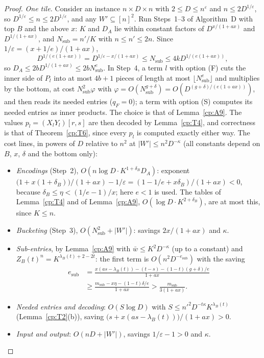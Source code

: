 \documentclass[11pt]{article}
\theoremstyle{definition}
\theoremstyle{remark}
\providecommand{\eps}{\varepsilon}
\newcommand{\abs}[1]{\lvert #1\rvert}
\newcommand{\ZB}{Z_B}                         %
\newcommand{\lamB}{\lambda_B}                 %
\newcommand{\delB}{\delta_B}                  %
\newcommand{\AlgD}{Algorithm~D}                             %
\begin{document}
\begin{proof}
\emph{One tile.} Consider an instance $n\times D\times n$ with $2\le D\le n^\eps$ and $n\le2D^{1/\eps}$, so $D^{1/\eps}\le n\le2D^{1/\eps}$, and any $W'\subseteq[n]^2$. Run Steps~1--3 of \AlgD{} with top $B$ and the above $x$: $K$ and $D_A$ lie within constant factors of $D^{x/(1+ax)}$ and $D^{1/(1+ax)}$, and $N_{\mathrm{sub}}=n'/K$ with $n\le n'\le2n$. Since $1/\eps=(x+1/e)/(1+ax)$,
\[
D^{1/(e(1+ax))}=D^{1/\eps-x/(1+ax)}\le N_{\mathrm{sub}}\le4kD^{1/(e(1+ax))},
\]
so $D_A\le2bD^{1/(1+ax)}\le2bN_{\mathrm{sub}}^e$. In Step~4, a term $l$ with option (F) cuts the inner side of $P_l$ into at most $4b+1$ pieces of length at most $\lfloor N_{\mathrm{sub}}^e\rfloor$ and multiplies by the bottom, at cost $N_{\mathrm{sub}}^2\varphi$ with $\varphi=O(N_{\mathrm{sub}}^{g+\delta})=O(D^{(g+\delta)/(e(1+ax))})$, and then reads its needed entries ($q_F=0$); a term with option (S) computes its needed entries as inner products. The choice is that of Lemma~\ref{cp:A9}. The values $p_l=(X_lY_l)[r,s]$ are then decoded by Lemma~\ref{cp:T4}, and correctness is that of Theorem~\ref{cp:T6}, since every $p_l$ is computed exactly either way. The cost lines, in powers of $D$ relative to $n^2$ at $\abs{W'}\le n^2D^{-\kappa}$ (all constants depend on $B$, $x$, $\delta$ and the bottom only):
\begin{itemize}
\item \emph{Encodings} (Step~2), $O(n\log D\cdot K^{1+\delB}D_A)$: exponent $\bigl(1+x(1+\delB)\bigr)/(1+ax)-1/\eps=(1-1/e+x\delB)/(1+ax)<0$, because $\delB\le\eta<(1/e-1)/x$; here $e<1$ is used. The tables of Lemma~\ref{cp:T4} and of Lemma~\ref{cp:A9}, $O(\log D\cdot K^{2+\delB})$, are at most this, since $K\le n$.
\item \emph{Bucketing} (Step~3), $O(N_{\mathrm{sub}}^2+\abs{W'})$: savings $2x/(1+ax)$ and $\kappa$.
\item \emph{Sub-entries}, by Lemma~\ref{cp:A9} with $\bar w\le K^2D^{-\kappa}$ (up to a constant) and $\ZB(t)^n=K^{\lamB(t)+2-2t}$: the first term is $O(n^2D^{-e_{\mathrm{sub}}})$ with the saving
\[
\begin{split}
e_{\mathrm{sub}}&=\frac{x(as-\lamB(t))-(t-s)-(1-t)(g+\delta)/e}{1+ax}\\
&\ge\frac{m_{\mathrm{sub}}-x\eta-(1-t)\delta/e}{1+ax}>\frac{m_{\mathrm{sub}}}{3(1+ax)} .
\end{split}
\]
\item \emph{Needed entries and decoding}: $O(S\log D)$ with $S\le n'^2D^{-t\kappa}K^{\lamB(t)}$ (Lemma~\ref{cp:T2}(b)), saving $\bigl(s+x(as-\lamB(t))\bigr)/(1+ax)>0$.
\item \emph{Input and output}: $O(nD+\abs{W'})$, savings $1/\eps-1>0$ and $\kappa$.

\end{itemize}
\end{proof}
\end{document}
